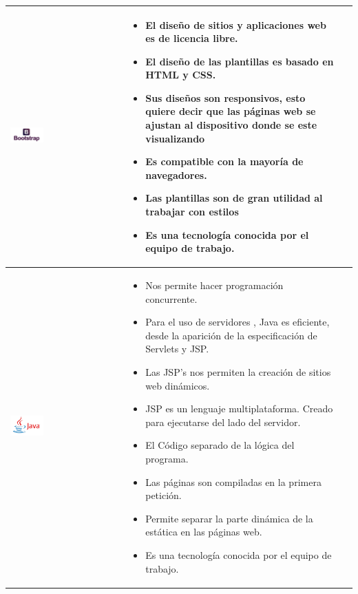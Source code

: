 \newpage
\begin{table}[b!]
	\centering
	\begin{tabular}{|p{2cm}|ll}
		\hline
		\multicolumn{1}{|p{5cm}|}{\includegraphics[width=0.3\textwidth]{images/bootstrap}} &   
		\multicolumn{1}{p{10cm}|}{
		\begin{itemize}
		\vspace{-15mm}
		\item El diseño de sitios y aplicaciones web es de licencia libre.
		\item El diseño de las  plantillas es basado en HTML y CSS.
		\item Sus diseños son responsivos, esto quiere decir que las páginas web se ajustan al dispositivo donde se este visualizando  
		\item Es compatible con la mayoría de navegadores.
		\item Las plantillas son de gran utilidad al trabajar con estilos
		\item Es una tecnología conocida por el equipo de trabajo.
		\end{itemize}} \\
		\hline
		\multicolumn{1}{|p{5cm}|}{\includegraphics[width=0.3\textwidth]{images/java}}      &   
		\multicolumn{1}{p{10cm}|}{
		\begin{itemize}
		\vspace{-20mm}
		\item Nos permite hacer programación concurrente.
		\item Para el uso de servidores , Java es eficiente, desde la aparición de la especificación de Servlets y JSP.
		\item Las JSP's nos permiten la  creación de sitios web dinámicos.
		\item JSP es un lenguaje multiplataforma. Creado para ejecutarse del lado del servidor.
		\item El Código separado de la lógica del programa.
		\item Las páginas son compiladas en la primera petición.
		\item Permite separar la parte dinámica de la estática en las páginas web.
		\item Es una tecnología conocida por el equipo de trabajo.
		\end{itemize}} \\
		\hline
	\end{tabular}
\end{table}

